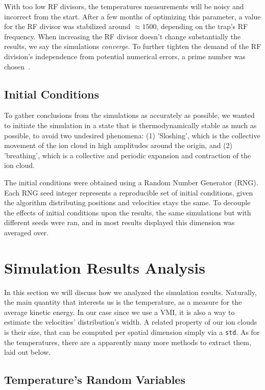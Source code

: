 With too low RF divisors, the temperatures measurements will be noisy and incorrect from the start. After a few months of optimizing this parameter, a value for the RF divisor was stabilized around $\approx 1500$, depending on the trap's RF frequency. When increasing the RF divisor doesn't change substantially the results, we say the simulations \emph{converge}. To further tighten the demand of the RF division's independence from potential numerical errors, a prime number was chosen~\cite{primesieve}.

\subsection{Initial Conditions}

To gather conclusions from the simulations as accurately as possible, we wanted to initiate the simulation in a state that is thermodynamically stable as much as possible, to avoid two undesired phenomena: (1) 'Sloshing', which is the collective movement of the ion cloud in high amplitudes around the origin, and (2) 'breathing', which is a collective and periodic expansion and contraction of the ion cloud.

The initial conditions were obtained using a Random Number Generator (RNG). Each RNG seed integer represents a reproducible set of initial conditions, given the algorithm distributing positions and velocities stays the same. To decouple the effects of initial conditions upon the results, the same simulations but with different seeds were ran, and in most results displayed this dimension was averaged over.

\section{Simulation Results Analysis}\label{sec:intro/-y-options}

In this section we will discuss how we analyzed the simulation results. Naturally, the main quantity that interests us is the temperature, as a measure for the average kinetic energy. In our case since we use a VMI, it is also a way to estimate the velocities' distribution's width. A related property of our ion clouds is their size, that can be computed per spatial dimension simply via a \texttt{std}. As for the temperatures, there are a apparently many more methods to extract them, laid out below.

\subsection{Temperature's Random Variables}

